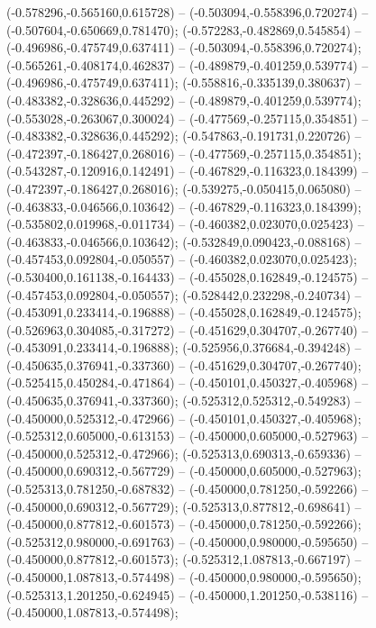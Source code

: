  (-0.578296,-0.565160,0.615728) -- (-0.503094,-0.558396,0.720274) -- (-0.507604,-0.650669,0.781470);
 (-0.572283,-0.482869,0.545854) -- (-0.496986,-0.475749,0.637411) -- (-0.503094,-0.558396,0.720274);
 (-0.565261,-0.408174,0.462837) -- (-0.489879,-0.401259,0.539774) -- (-0.496986,-0.475749,0.637411);
 (-0.558816,-0.335139,0.380637) -- (-0.483382,-0.328636,0.445292) -- (-0.489879,-0.401259,0.539774);
 (-0.553028,-0.263067,0.300024) -- (-0.477569,-0.257115,0.354851) -- (-0.483382,-0.328636,0.445292);
 (-0.547863,-0.191731,0.220726) -- (-0.472397,-0.186427,0.268016) -- (-0.477569,-0.257115,0.354851);
 (-0.543287,-0.120916,0.142491) -- (-0.467829,-0.116323,0.184399) -- (-0.472397,-0.186427,0.268016);
 (-0.539275,-0.050415,0.065080) -- (-0.463833,-0.046566,0.103642) -- (-0.467829,-0.116323,0.184399);
 (-0.535802,0.019968,-0.011734) -- (-0.460382,0.023070,0.025423) -- (-0.463833,-0.046566,0.103642);
 (-0.532849,0.090423,-0.088168) -- (-0.457453,0.092804,-0.050557) -- (-0.460382,0.023070,0.025423);
 (-0.530400,0.161138,-0.164433) -- (-0.455028,0.162849,-0.124575) -- (-0.457453,0.092804,-0.050557);
 (-0.528442,0.232298,-0.240734) -- (-0.453091,0.233414,-0.196888) -- (-0.455028,0.162849,-0.124575);
 (-0.526963,0.304085,-0.317272) -- (-0.451629,0.304707,-0.267740) -- (-0.453091,0.233414,-0.196888);
 (-0.525956,0.376684,-0.394248) -- (-0.450635,0.376941,-0.337360) -- (-0.451629,0.304707,-0.267740);
 (-0.525415,0.450284,-0.471864) -- (-0.450101,0.450327,-0.405968) -- (-0.450635,0.376941,-0.337360);
 (-0.525312,0.525312,-0.549283) -- (-0.450000,0.525312,-0.472966) -- (-0.450101,0.450327,-0.405968);
 (-0.525312,0.605000,-0.613153) -- (-0.450000,0.605000,-0.527963) -- (-0.450000,0.525312,-0.472966);
 (-0.525313,0.690313,-0.659336) -- (-0.450000,0.690312,-0.567729) -- (-0.450000,0.605000,-0.527963);
 (-0.525313,0.781250,-0.687832) -- (-0.450000,0.781250,-0.592266) -- (-0.450000,0.690312,-0.567729);
 (-0.525313,0.877812,-0.698641) -- (-0.450000,0.877812,-0.601573) -- (-0.450000,0.781250,-0.592266);
 (-0.525312,0.980000,-0.691763) -- (-0.450000,0.980000,-0.595650) -- (-0.450000,0.877812,-0.601573);
 (-0.525312,1.087813,-0.667197) -- (-0.450000,1.087813,-0.574498) -- (-0.450000,0.980000,-0.595650);
 (-0.525313,1.201250,-0.624945) -- (-0.450000,1.201250,-0.538116) -- (-0.450000,1.087813,-0.574498);
